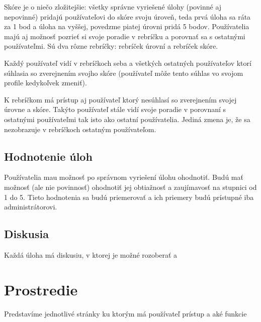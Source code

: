 Skóre je o niečo zložitejšie: všetky správne vyriešené úlohy (povinné aj nepovinné)
pridajú používateľovi do skóre svoju úroveň, teda prvá úloha sa ráta za
1 bod a úloha na vyššej, povedzme piatej úrovni pridá 5 bodov.
\newline
\newline
Používatelia majú aj možnosť pozrieť si svoje poradie v rebríčku a porovnať sa
s ostatnými používateľmi. Sú dva rôzne rebríčky: rebríček úrovní a rebríček skóre.

Každý používateľ vidí v rebríčkoch seba a všetkých ostatných používateľov ktorí
súhlasia so zverejnením svojho skóre (používateľ môže tento súhlas vo svojom profile kedykoľvek zmeniť).

K rebríčkom má prístup aj používateľ ktorý nesúhlasí so zverejnením svojej úrovne a skóre.
Takýto používateľ stále vidí svoje poradie v porovnaní s ostatnými používateľmi tak isto
ako ostatní používatelia. Jediná zmena je, že sa nezobrazuje v rebríčkoch ostatným používateľom.

\subsection{Hodnotenie úloh}
\label{rating}
Používatelia mau možnosť po správnom vyriešení úlohu ohodnotiť.
Budú mať možnosť (ale nie povinnosť) ohodnotiť jej obtiažnosť a
zaujímavosť na stupnici od 1 do 5. Tieto hodnotenia sa budú priemerovať a ich priemery
budú prístupné iba administrátorovi.

\subsection{Diskusia}
Každá úloha má diskusiu, v ktorej je možné rozoberať a
\section{Prostredie}
Predstavíme jednotlivé stránky ku ktorým má používateľ prístup a aké
funkcie
